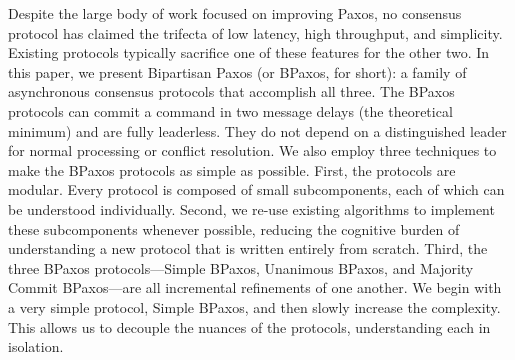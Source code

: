 Despite the large body of work focused on improving Paxos, no consensus
protocol has claimed the trifecta of low latency, high throughput, and
simplicity. Existing protocols typically sacrifice one of these features for
the other two. In this paper, we present Bipartisan Paxos (or BPaxos, for
short): a family of asynchronous consensus protocols that accomplish all three.
The BPaxos protocols can commit a command in two message delays (the
theoretical minimum) and are fully leaderless. They do not depend on a
distinguished leader for normal processing or conflict resolution. We also
employ three techniques to make the BPaxos protocols as simple as possible.
%
First, the protocols are modular. Every protocol is composed of small
subcomponents, each of which can be understood individually.
%
Second, we re-use existing algorithms to implement these subcomponents whenever
possible, reducing the cognitive burden of understanding a new protocol that is
written entirely from scratch.
%
Third, the three BPaxos protocols---Simple BPaxos, Unanimous BPaxos, and
Majority Commit BPaxos---are all incremental refinements of one another. We
begin with a very simple protocol, Simple BPaxos, and then slowly increase the
complexity. This allows us to decouple the nuances of the protocols,
understanding each in isolation.
